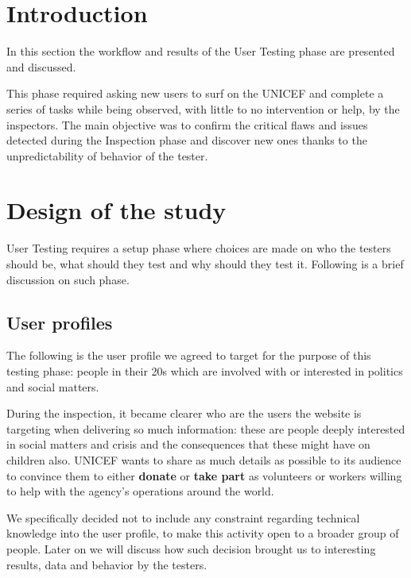 \section{Introduction}
In this section the workflow and results of the User Testing phase are presented and discussed.

This phase required asking new users to surf on the UNICEF and complete a series of tasks while being observed, with little to no intervention or help, by the inspectors. The main objective was to confirm the critical flaws and issues detected during the Inspection phase and discover new ones thanks to the unpredictability of behavior of the tester.

\section{Design of the study}
User Testing requires a setup phase where choices are made on who the testers should be, what should they test and why should they test it. Following is a brief discussion on such phase.

\subsection{User profiles}
The following is the user profile we agreed to target for the purpose of this testing phase: people in their 20s which are involved with or interested in politics and social matters.

During the inspection, it became clearer who are the users the website is targeting when delivering so much information: these are people deeply interested in social matters and crisis and the consequences that these might have on children also. UNICEF wants to share as much details as possible to its audience to convince them to either \textbf{donate} or \textbf{take part} as volunteers or workers willing to help with the agency's operations around the world.

We specifically decided not to include any constraint regarding technical knowledge into the user profile, to make this activity open to a broader group of people. Later on we will discuss how such decision brought us to interesting results, data and behavior by the testers.


